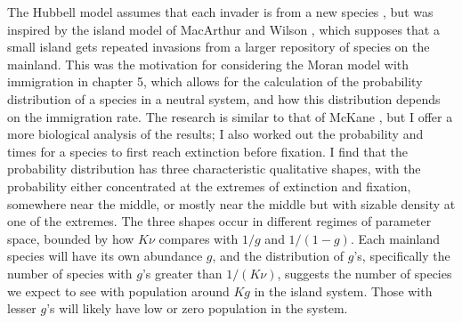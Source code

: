 The Hubbell model assumes that each invader is from a new species \cite{Hubbell2001}, but was inspired by the island model of MacArthur and Wilson \cite{MacArthur1967a}, which supposes that a small island gets repeated invasions from a larger repository of species on the mainland. 
This was the motivation for considering the Moran model with immigration in chapter 5, which allows for the calculation of the probability distribution of a species in a neutral system, and how this distribution depends on the immigration rate. %
The research is similar to that of McKane \cite{McKane2004}, but I offer a more biological analysis of the results; I also worked out the probability and times for a species to first reach extinction before fixation. %
I find that the probability distribution has three characteristic qualitative shapes, with the probability either concentrated at the extremes of extinction and fixation, somewhere near the middle, or mostly near the middle but with sizable density at one of the extremes. 
The three shapes occur in different regimes of parameter space, bounded by how $K\nu$ compares with $1/g$ and $1/(1-g)$. 
Each mainland species will have its own abundance $g$, and the distribution of $g$'s, specifically the number of species with $g$'s greater than $1/(K\nu)$, suggests the number of species we expect to see with population around $K g$ in the island system. 
Those with lesser $g$'s will likely have low or zero population in the system. 



